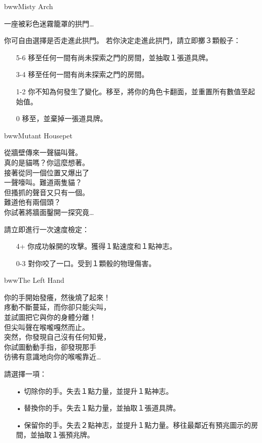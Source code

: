 \linebreak[0]%
\begin{EventCard}{bww}{Misty Arch}
  \begin{CardStory}
    一座被彩色迷霧籠罩的拱門…
  \end{CardStory}
  你可自由選擇是否走進此拱門。\smallbreak
  若你決定走進此拱門，請立即擲３顆骰子：
  \begin{itemize}
    \item[5-6] 移至任何一間有尚未探索之門的房間，並抽取１張道具牌。
    \item[3-4] 移至任何一間有尚未探索之門的房間。
    \item[1-2] 你不知為何發生了變化。移至，將你的角色卡翻面，並重置所有數值至起始值。
    \item[0] 移至，並棄掉一張道具牌。
  \end{itemize}
\end{EventCard}%
\linebreak[0]%
\begin{EventCard}{bww}{Mutant Housepet}
  \begin{CardStory}
    從牆壁傳來一聲貓叫聲。\\
    真的是貓嗎？你這麼想著。\\
    接著從同一個位置又爆出了\\
    一聲嚎叫。難道兩隻貓？\\
    但搔抓的聲音又只有一個。\\
    難道他有兩個頭？\\
    你試著將牆面鑿開一探究竟…
  \end{CardStory}
  請立即進行一次速度檢定：
  \begin{itemize}
    \item[4+] 你成功躲開\ThisName{}的攻擊。獲得１點速度和１點神志。
    \item[0-3] \ThisName{}對你咬了一口。受到１顆骰的物理傷害。
  \end{itemize}
\end{EventCard}%
\linebreak[0]%
\begin{EventCard}{bww}{The Left Hand}
  \begin{CardStory}
    你的手開始發癢，然後燒了起來！\\
    疼動不斷蔓延，而你卻只能尖叫，\\
    並試圖把它與你的身體分離！\\
    但尖叫聲在喉嚨嘎然而止。\\
    突然，你發現自己沒有任何知覺，\\
    你試圖動動手指，卻發現那手\\
    彷彿有意識地向你的喉嚨靠近…
  \end{CardStory}
  請選擇一項：
  \begin{itemize}
    \item[•] 切除你的手。失去１點力量，並提升１點神志。
    \item[•] 替換你的手。失去１點力量，並抽取１張道具牌。
    \item[•] 保留你的手。失去２點神志，並提升１點力量。移往最鄰近有預兆圖示的房間，並抽取１張預兆牌。
  \end{itemize}
\end{EventCard}%
